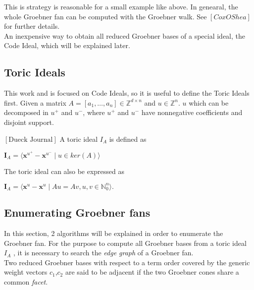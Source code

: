 This is strategy is reasonable for a small example like above.
In genearal, the whole Groebner fan can be computed with the Groebner walk.
See $\left[ Cox OShea \right]$ for further details.\\
An inexpensive way to obtain all reduced Groebner bases of a special ideal, the Code Ideal, which will be explained later.

\subsection{Toric Ideals}
\label{subsec:toric}
This work and is focused on Code Ideals, so it is useful to define the Toric Ideals first. Given a matrix $A =\left[a_{1},\dots, a_{n}  \right] \in \mathbb{Z}^{d \times n } $ and $u \in \mathbb{Z}^{n}$. $u$ which can be decomposed in $u^{+} $ and $u^{-}$, where $u^{+} $ and $u^{-}$ have nonnegative coefficients and disjoint support.

\begin{env_definition}
$\left[ \textrm{Dueck Journal} \right] $ A toric ideal $I_{A}$ is defined as
\begin{center}
$ \textbf{I}_{A} = \langle \textbf{x}^{u^{+}} - \textbf{x}^{u^{-}} \mid u \in ker \left(  A \right) \rangle  $
\end{center}


\end{env_definition}

The toric ideal can also be expressed as
\begin{center}
$ \textbf{I}_{A} =  \langle \textbf{x}^{u} - \textbf{x}^{u} \mid Au = Av, u,v \in \mathbb{N}^{n}_{0} \rangle .$
\end{center}



\subsection{Enumerating Groebner fans}
\label{subsec:enumerate}

In this section, 2 algorithms will be explained in order to enumerate the Groebner fan.
For the purpose to compute all Groebner bases from a toric ideal $I_A$ , it is necessary to search the \textit{edge graph} of a Groebner fan.\\
Two reduced Groebner bases with respect to a term order covered by the generic weight vectors $c_{1}$,$c_{2}$ are said to be adjacent if the two Groebner cones share a common \textit{facet}.

